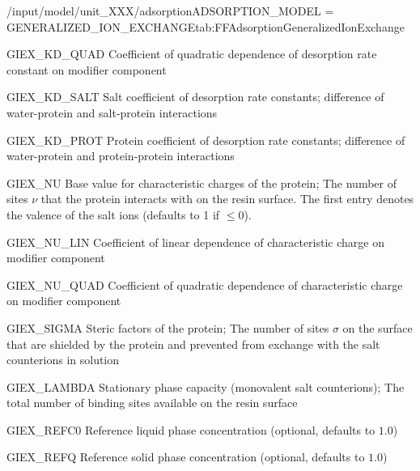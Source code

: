 \begin{condsubgroup}{/input/model/unit\_XXX/adsorption}{ADSORPTION\_MODEL = GENERALIZED\_ION\_EXCHANGE}{tab:FFAdsorptionGeneralizedIonExchange}
\begin{dataset}[unit=\si{\per\square\ModUnit},type=double,length={\texttt{NCOMP}}]{GIEX\_KD\_QUAD}
    Coefficient of quadratic dependence of desorption rate constant on modifier component
  \end{dataset}
  \begin{dataset}[type=double,length={\texttt{NCOMP}}]{GIEX\_KD\_SALT}
    Salt coefficient of desorption rate constants; difference of water-protein and salt-protein interactions
  \end{dataset}
  \begin{dataset}[unit=\si{\raiseto{3}\metre\of{MP}\per\mol}, type=double,length={\texttt{NCOMP}}]{GIEX\_KD\_PROT}
    Protein coefficient of desorption rate constants; difference of water-protein and protein-protein interactions
  \end{dataset}
  \begin{dataset}[type=double,length={\texttt{NCOMP}}]{GIEX\_NU}
    Base value for characteristic charges of the protein; The number of sites $\nu$ that the protein interacts with on the resin surface.
    The first entry denotes the valence of the salt ions (defaults to 1 if $\leq 0$).
  \end{dataset}
  \begin{dataset}[unit=\si{\per\ModUnit},type=double,length={\texttt{NCOMP}}]{GIEX\_NU\_LIN}
    Coefficient of linear dependence of characteristic charge on modifier component
  \end{dataset}
  \begin{dataset}[unit=\si{\per\square\ModUnit},type=double,length={\texttt{NCOMP}}]{GIEX\_NU\_QUAD}
    Coefficient of quadratic dependence of characteristic charge on modifier component
  \end{dataset}
  \begin{dataset}[type=double,range={$\geq 0$},length={\texttt{NCOMP}}]{GIEX\_SIGMA}
    Steric factors of the protein; The number of sites $\sigma$ on the surface that are shielded by the protein and prevented from exchange with the salt counterions in solution
  \end{dataset}
  \begin{dataset}[unit=\si{\mol\per\cubic\metre\of{SP}}, type=double,range={$\geq 0$},length={1}]{GIEX\_LAMBDA}
    Stationary phase capacity (monovalent salt counterions); The total number of binding sites available on the resin surface 
  \end{dataset}
  \begin{dataset}[unit=\si{\mol\per\raiseto{3}\metre\of{MP}}, type=double,range={$> 0$},length={1}]{GIEX\_REFC0}
    Reference liquid phase concentration (optional, defaults to $1.0$)
  \end{dataset}
  \begin{dataset}[unit=\si{\mol\per\raiseto{3}\metre\of{SP}}, type=double,range={$> 0$},length={1}]{GIEX\_REFQ}
    Reference solid phase concentration (optional, defaults to $1.0$) 
  \end{dataset}
\end{condsubgroup}


